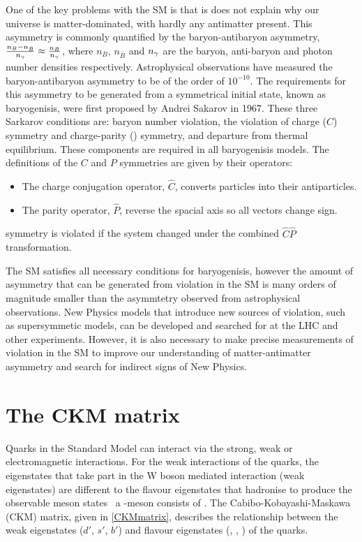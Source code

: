 One of the key problems with the SM is that is does not explain why our universe is matter-dominated, with hardly any antimatter present. This asymmetry is commonly quantified by the baryon-antibaryon asymmetry, $\frac{n_{B} - n_{\bar{B}}}{n_{{\gamma}}} \approx \frac{n_{B}}{n_{{\gamma}}}$, where $n_{B}$, $n_{\bar{B}}$ and $n_{{\gamma}}$ are the baryon, anti-baryon and photon number densities respectively. Astrophysical observations have measured the baryon-antibaryon asymmetry to be of the order of $10^{-10}$. The requirements for this asymmetry to be generated from a symmetrical initial state, known as baryogenisis, were first proposed by Andrei Sakarov in 1967. These three Sarkarov conditions are: baryon number violation, the violation of charge ($C$) symmetry and charge-parity (\CP) symmetry, and departure from thermal equilibrium. These components are required in all baryogenisis models. The definitions of the $C$ and $P$ symmetries are given by their operators:
\begin{itemize}
\item The charge conjugation operator, $\hat{C}$, converts particles into their antiparticles.
\item The parity operator, $\hat{P}$, reverse the spacial axis so all vectors change sign.
\end{itemize}
\CP symmetry is violated if the system changed under the combined $\hat{C}\hat{P}$ transformation.

The SM satisfies all necessary conditions for baryogenisis, however the amount of asymmetry that can be generated from \CP violation in the SM is many orders of magnitude smaller than the asymmtetry observed from astrophysical observations. New Physics models that introduce new sources of \CP violation, such as supersymmetic models, can be developed and searched for at the LHC and other experiments. However, it is also necessary to make precise measurements of \CP violation in the SM to improve our understanding of matter-antimatter asymmetry and search for indirect signs of New Physics.


\section{The CKM matrix}

Quarks in the Standard Model can interact via the strong, weak or electromagnetic interactions. For the weak interactions of the quarks, the eigenstates that take part in the W boson mediated interaction (weak eigenstates) are different to the flavour eigenstates that hadronise to produce the observable meson states \eg\ a \Bm-meson consists of \uquarkbar\bquark. The Cabibo-Kobayashi-Maskawa (CKM) matrix, given in \eqn \ref{CKMmatrix}, describes the relationship between the weak eigenstates ($d'$, $s'$, $b'$) and flavour eigenstates (\dquark, \squark, \bquark) of the quarks. 

